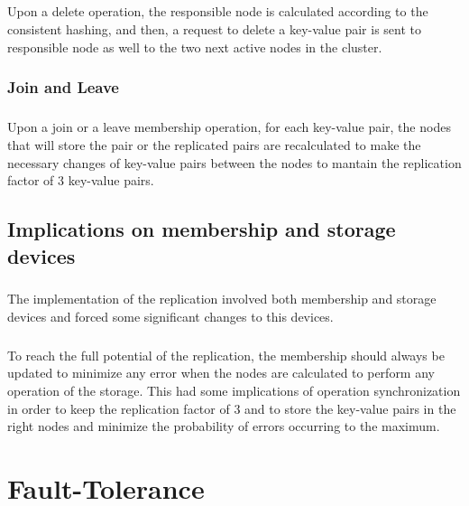 \documentclass{report}
\begin{document}
					\paragraph{} Upon a delete operation, the responsible node is calculated
					according to the consistent hashing, and then, a request to delete a
					key-value pair is sent to responsible node as well to the two next 
					active nodes in the cluster.

				\subsection{Join and Leave}
					\paragraph{} Upon a join or a leave membership operation, for each key-value 
					pair, the nodes that will store the pair or the replicated pairs are
					recalculated to make the necessary changes of key-value pairs between
					the nodes to mantain the replication factor of 3 key-value pairs.

			\section{Implications on membership and storage devices}
	
				\paragraph{} The implementation of the replication involved both membership
				and storage devices and forced some significant changes to this devices.
				
				\paragraph{} To reach the full potential of the replication, the membership
				should always be updated to minimize any error when the nodes are calculated
				to perform any operation of the storage. This had some implications of
				operation synchronization in order to keep the replication factor of
				3 and to store the key-value pairs in the right nodes and minimize the 
				probability of errors occurring to the maximum.

	\chapter{Fault-Tolerance}
	
\end{document}
